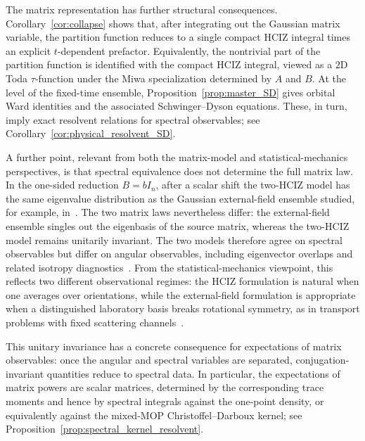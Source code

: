 \documentclass[11pt,a4paper]{article}
\theoremstyle{definition}\newtheorem{definition}[theorem]{Definition}
\theoremstyle{remark}\newtheorem{remark}[theorem]{Remark}
\numberwithin{equation}{section}
\begin{document}
The matrix representation has further structural consequences. Corollary~\ref{cor:collapse} shows that, after integrating out the Gaussian matrix variable, the partition function reduces to a single compact HCIZ integral times an explicit $t$-dependent prefactor. Equivalently, the nontrivial part of the partition function is identified with the compact HCIZ integral, viewed as a $2$D Toda $\tau$-function under the Miwa specialization determined by $A$ and $B$. At the level of the fixed-time ensemble, Proposition~\ref{prop:master_SD} gives orbital Ward identities and the associated Schwinger--Dyson equations. These, in turn, imply exact resolvent relations for spectral observables; see Corollary~\ref{cor:physical_resolvent_SD}.

A further point, relevant from both the matrix-model and statistical-mechanics perspectives, is that spectral equivalence does not determine the full matrix law. In the one-sided reduction $B=bI_n$, after a scalar shift the two-HCIZ model has the same eigenvalue distribution as the Gaussian external-field ensemble studied, for example, in~\cite{Bleher2011,BleherDelvauxKuijlaars2011}. The two matrix laws nevertheless differ: the external-field ensemble singles out the eigenbasis of the source matrix, whereas the two-HCIZ model remains unitarily invariant. The two models therefore agree on spectral observables but differ on angular observables, including eigenvector overlaps and related isotropy diagnostics~\cite{ PaccoRos2023,BenigniCipolloni2024}. From the statistical-mechanics viewpoint, this reflects two different observational regimes: the HCIZ formulation is natural when one averages over orientations, while the external-field formulation is appropriate when a distinguished laboratory basis breaks rotational symmetry, as in transport problems with fixed scattering channels~\cite{JKMS2023,Beenakker1997}.

This unitary invariance has a concrete consequence for expectations of matrix observables: once the angular and spectral variables are separated, conjugation-invariant quantities reduce to spectral data. In particular, the expectations of matrix powers are scalar matrices, determined by the corresponding trace moments and hence by spectral integrals against the one-point density, or equivalently against the mixed-MOP Christoffel--Darboux kernel; see Proposition~\ref{prop:spectral_kernel_resolvent}.
\end{document}
